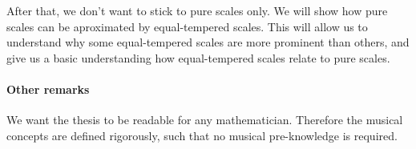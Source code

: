 \documentclass[a4paper]{article}
\begin{document}
After that, we don't want to stick to pure scales only.
We will show how pure scales can be aproximated by equal-tempered scales.
This will allow us to understand why some equal-tempered scales are more prominent than others, and give us a basic understanding how equal-tempered scales relate to pure scales.

\paragraph{Other remarks}
We want the thesis to be readable for any mathematician.
Therefore the musical concepts are defined rigorously, such that no musical pre-knowledge is required.

\end{document}
